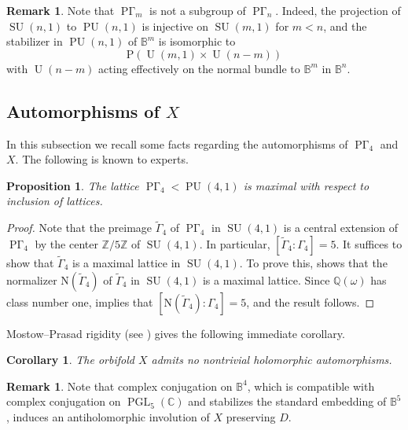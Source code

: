 \documentclass[11pt]{amsart}
\theoremstyle{plain}
\newtheorem{prop}[thm]{Proposition}
\newtheorem{cor}[thm]{Corollary}
\theoremstyle{definition}
\newtheorem{rem}[thm]{Remark}
\theoremstyle{remark}
\newcommand{\bbB}{\mathbb{B}}
\newcommand{\bbC}{\mathbb{C}}
\newcommand{\bbQ}{\mathbb{Q}}
\newcommand{\bbZ}{\mathbb{Z}}
\newcommand{\Gam}{\Gamma}
\newcommand{\om}{\omega}
\DeclareMathOperator{\U}{U}
\DeclareMathOperator{\PGL}{PGL}
\DeclareMathOperator{\PU}{PU}
\DeclareMathOperator{\SU}{SU}
\DeclareMathOperator{\PGam}{\mathrm{P}\Gamma}
\newcommand{\wt}{\widetilde}
\newenvironment{pf}{\begin{proof}}{\end{proof}}
\begin{document}
\begin{rem}\label{rem:ProjectiveEmbed}
Note that $\PGam_m$ is not a subgroup of $\PGam_n$. Indeed, the projection of $\SU(n,1)$ to $\PU(n,1)$ is injective on $\SU(m,1)$ for $m < n$, and the stabilizer in $\PU(n,1)$ of $\bbB^m$ is isomorphic to
	\[
	\mathrm{P}\!\left(\U(m,1) \times \U(n-m)\right)
	\]
with $\U(n-m)$ acting effectively on the normal bundle to $\bbB^m$ in $\bbB^n$.
\end{rem}

\subsection{Automorphisms of $X$}\label{ssec:X4auts}

In this subsection we recall some facts regarding the automorphisms of $\PGam_4$ and $X$. The following is known to experts.

\begin{prop}\label{prop:Maximal}
The lattice $\PGam_4 < \PU(4,1)$ is maximal with respect to inclusion of lattices.
\end{prop}
\begin{pf}
Note that the preimage $\wt{\Gam}_4$ of $\PGam_4$ in $\SU(4,1)$ is a central extension of $\PGam_4$ by the center $\bbZ / 5\bbZ$ of $\SU(4,1)$. In particular, $[\wt{\Gam}_4 : \Gam_4] = 5$. It suffices to show that $\wt{\Gam}_4$ is a maximal lattice in $\SU(4,1)$. To prove this, \cite[Prop.\ 3.8]{MR3163356} shows that the normalizer $\mathrm{N}(\wt{\Gam}_4)$ of $\wt{\Gam}_4$ in $\SU(4,1)$ is a maximal lattice. Since $\bbQ(\om)$ has class number one, \cite[Lem.\ 3.7]{MR3163356} implies that $[\mathrm{N}(\wt{\Gam}_4): \Gam_4] = 5$, and the result follows.
\end{pf}

Mostow--Prasad rigidity (see \cite{Prasad}) gives the following immediate corollary.

\begin{cor}\label{cor:ArithNoAuts}
The orbifold $X$ admits no nontrivial holomorphic automorphisms.
\end{cor}

\begin{rem}\label{rem:Anti1}
Note that complex conjugation on $\bbB^4$, which is compatible with complex conjugation on $\PGL_5(\bbC)$ and stabilizes the standard embedding of $\bbB^5$, induces an antiholomorphic involution of $X$ preserving $D$.
\end{rem}
\end{document}

